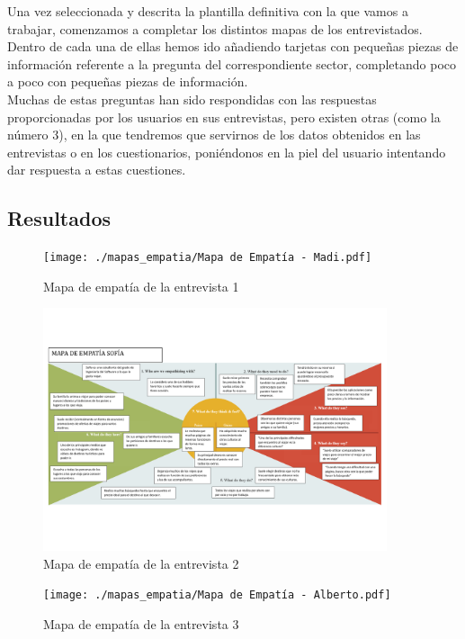  Una vez seleccionada y descrita la plantilla definitiva con la que vamos a trabajar, comenzamos a completar los distintos mapas de los entrevistados. Dentro de cada una de ellas hemos ido añadiendo tarjetas con pequeñas piezas de información referente a la pregunta del correspondiente sector, completando poco a poco con pequeñas piezas de información. \\

Muchas de estas preguntas han sido respondidas con las respuestas proporcionadas por los usuarios en sus entrevistas, pero existen otras (como la número 3), en la que tendremos que servirnos de los datos obtenidos en las entrevistas o en los cuestionarios, poniéndonos en la piel del usuario intentando dar respuesta a estas cuestiones.
\subsection{Resultados}
\begin{figure}[H]
    \centering 
    \texttt{[image: ./mapas\_empatia/Mapa de Empatía - Madi.pdf]}
    \caption{Mapa de empatía de la entrevista 1}
    \label{fig:mapa_madi}
\end{figure}

\begin{figure}[H]
    \centering 
    \includegraphics[width=0.9\textwidth]{./mapas_empatia/Mapa de Empatía - Sofía.pdf}
    \caption{Mapa de empatía de la entrevista 2}
    \label{fig:mapa_sofia}
\end{figure}

\begin{figure}[H]
    \centering 
    \texttt{[image: ./mapas\_empatia/Mapa de Empatía - Alberto.pdf]}
    \caption{Mapa de empatía de la entrevista 3}
    \label{fig:mapa_alberto}
\end{figure}

